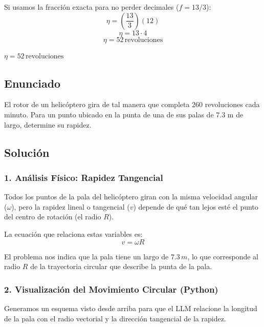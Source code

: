 \documentclass[12pt, a4paper]{article}
\begin{document}
Si usamos la fracción exacta para no perder decimales ($f = 13/3$):
$$ \eta = \left(\frac{13}{3}\right) (12) $$
$$ \eta = 13 \cdot 4 $$
$$ \eta = 52 \, \text{revoluciones} $$

\begin{tcolorbox}[colback=green!5!white, colframe=green!50!black, title=Respuesta Final]
\centering \Large $\eta = 52 \, \text{revoluciones}$
\end{tcolorbox}

\newpage

\subsection*{Enunciado}
El rotor de un helicóptero gira de tal manera que completa 260 revoluciones cada minuto. Para un punto ubicado en la punta de una de sus palas de 7.3 m de largo, determine su rapidez.

\subsection*{Solución}

\subsubsection*{1. Análisis Físico: Rapidez Tangencial}
Todos los puntos de la pala del helicóptero giran con la misma velocidad angular ($\omega$), pero la rapidez lineal o tangencial ($v$) depende de qué tan lejos esté el punto del centro de rotación (el radio $R$). 

La ecuación que relaciona estas variables es:
$$ v = \omega R $$

El problema nos indica que la pala tiene un largo de $7.3 \, \si{m}$, lo que corresponde al radio $R$ de la trayectoria circular que describe la punta de la pala.

\subsubsection*{2. Visualización del Movimiento Circular (Python)}
Generamos un esquema visto desde arriba para que el LLM relacione la longitud de la pala con el radio vectorial y la dirección tangencial de la rapidez.
\end{document}
